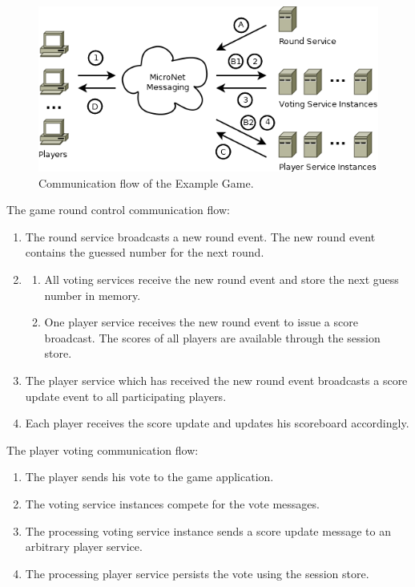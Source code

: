 \begin{figure}
	\centering
	\includegraphics[width=\textwidth]{images/architecture/SampleGame}
	\caption{Communication flow of the Example Game.}
	\label{fig:sample_game_flow}
\end{figure}

\noindent
The game round control communication flow:

\begin{enumerate}[label=\Alph*.]
  \item The round service broadcasts a new round event. The new round event
  contains the guessed number for the next round.
  \item \begin{enumerate}[label=\arabic*.]
    \item All voting services receive the new round event and store the next
    guess number in memory.
  	\item One player service receives the new round event to issue a score
  	broadcast. The scores of all players are available through the session store.
  \end{enumerate}
  \item The player service which has received the new round event broadcasts a
  score update event to all participating players.
  \item Each player receives the score update and updates his scoreboard
  accordingly.
   
\end{enumerate}

\noindent
The player voting communication flow:

\begin{enumerate}
  \item The player sends his vote to the game application.
  \item The voting service instances compete for the vote messages.
  \item The processing voting service instance sends a score update message to
  an arbitrary player service.
  \item The processing player service persists the vote using the session store.
\end{enumerate}

